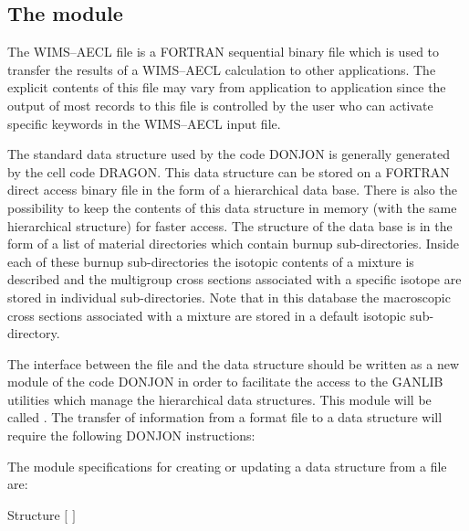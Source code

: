 \subsection{The  module}\label{sect:t16cpo}

The WIMS--AECL  file is a FORTRAN sequential binary file which is used to transfer the results of
a WIMS--AECL calculation to other applications.\cite{Griffiths94} The explicit contents of this file may vary
from application to application since the output of most records to this file is controlled by the user who can
activate specific keywords in the WIMS--AECL input file. 

\vskip 0.08cm

The standard  data structure used by the code DONJON is generally generated by the cell code
DRAGON. This data structure can be stored on a FORTRAN direct access binary
file in the form of a hierarchical data base. There is also the possibility to keep the contents of this
data structure in memory (with the same hierarchical structure) for faster access. The structure of the data
base is in the form of a list of material directories which contain burnup sub-directories. Inside each of
these burnup sub-directories the isotopic contents of a mixture is described and the multigroup cross
sections associated with a specific isotope are stored in individual sub-directories. Note that in this
database the macroscopic cross sections associated with a mixture are stored in a default isotopic
sub-directory. 

\vskip 0.08cm

The interface between the  file and the  data structure should be written as a new
module of the code DONJON in order to facilitate the access to the GANLIB utilities which manage the
hierarchical data structures. This module will be called . The transfer of information from a
 format file to a  data structure will require the
following DONJON instructions:

\vskip 0.08cm

The  module specifications for creating or updating a  data structure from a  file are:

\begin{DataStructure}{Structure }
  \moc{:=}   $[$  $]$  \moc{::}   \moc{;}  \\
\end{DataStructure}

